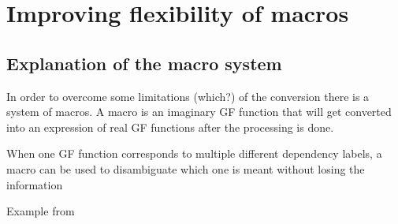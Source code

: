 \chapter{Improving flexibility of macros}
\label{improving-flexibility-macros}


\section{Explanation of the macro system}

In order to overcome some limitations (which?) of the conversion there is a system of macros. A macro is an imaginary GF function that will get converted into an expression of real GF functions after the processing is done.


When one GF function corresponds to multiple different dependency labels, a macro can be used to disambiguate which one is meant without losing the information

Example from \cite{kolachina-ranta-2017}








